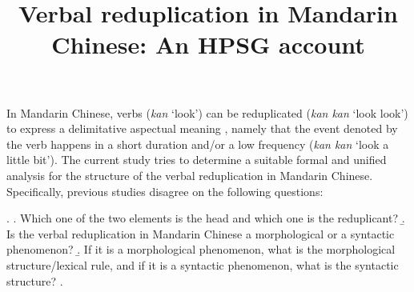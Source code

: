 \documentclass[
a4paper,
10pt,
oneside,
]{scrartcl}
\author{\vspace{-8ex}}
\title{\Large Verbal reduplication in Mandarin Chinese: An HPSG account}
\date{\vspace{-8ex}}
\begin{document}
\maketitle




\noindent
In Mandarin Chinese, verbs (\emph{kan} `look’) can be reduplicated (\emph{kan kan} `look look’) to express a delimitative aspectual meaning \citep[e.g.][]{Chao1968, LiThompson1981, XiaoMcEnery2004}, namely that the event denoted by the verb happens in a short duration and/or a low frequency \citep[155]{XiaoMcEnery2004} (\emph{kan kan} `look a little bit'). The current study tries to determine a suitable formal and unified analysis for the structure of the verbal reduplication in Mandarin Chinese. Specifically, previous studies disagree on the following questions:

\ex.
\a. Which one of the two elements is the head and which one is the reduplicant?
\b. Is the verbal reduplication in Mandarin Chinese a morphological or a syntactic phenomenon?
\b. If it is a morphological phenomenon, what is the morphological structure/lexical rule, and if it is a syntactic phenomenon, what is the syntactic structure?
\z.
\end{document}
